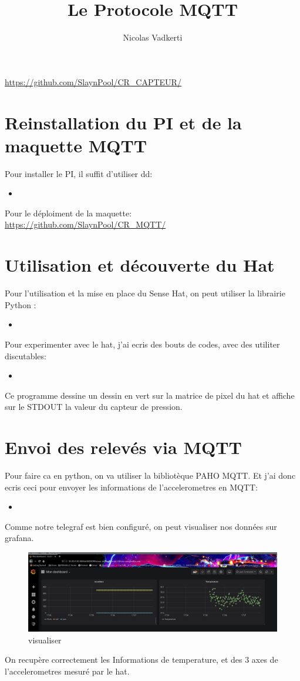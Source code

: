 \documentclass[10pt,a4paper]{article}
\title{Le Protocole MQTT}
\author{Nicolas Vadkerti}
\newcommand{\insertcode}[2]{\begin{itemize}\item[]\end{itemize}}
\begin{document}
\maketitle


\url{https://github.com/SlaynPool/CR_CAPTEUR/}

\section{Reinstallation du PI et de la maquette MQTT}

Pour installer le PI, il suffit d'utiliser dd:
\insertcode{commande/1.txt}{Installation de raspian}

Pour le déploiment de la maquette:\\
\url{https://github.com/SlaynPool/CR_MQTT/}

\section{Utilisation et découverte du Hat }

Pour l'utilisation et la mise en place du Sense Hat, on peut utiliser la librairie Python :
\insertcode{commande/2.txt}{Mise en place du hat}

Pour experimenter avec le hat, j'ai ecris des bouts de codes, avec des utiliter discutables:

\insertcode{src/prog1.py}{Premier Programme}
 Ce programme dessine un dessin en vert sur la matrice de pixel du hat et affiche sur le STDOUT la valeur du capteur de pression.
 
 \section{Envoi des relevés via MQTT}
 Pour faire ca en python, on va utiliser la bibliotèque PAHO MQTT.
 Et j'ai donc ecris ceci pour envoyer les informations de l'accelerometres en MQTT:
 \insertcode{src/monProg.py}{Mon petit programme}
 \newpage
 Comme notre telegraf est bien configuré, on peut visualiser nos données sur grafana. 
   \begin{figure}[h!]
\centering
\includegraphics[scale=0.250]{img/grafana.jpg}
\caption{visualiser}
\label{fig:qos}
\end{figure}

On recupère correctement les Informations de temperature, et des 3 axes de l'accelerometres mesuré par le hat.
\end{document}
